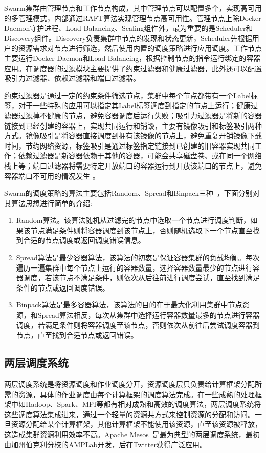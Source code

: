 Swarm集群由管理节点和工作节点构成，其中管理节点可以配置多个，实现高可用的多管理模式，内部通过RAFT算法实现管理节点高可用性。管理节点上除Docker Daemon守护进程、Load Balancing、Scaling组件外，最为重要的是Scheduler和Discovery组件。Discovery负责集群中节点的发现和状态更新，Scheduler先根据用户的资源需求对节点进行筛选，然后使用内置的调度策略进行应用调度。工作节点主要运行Docker Daemon和Load Balancing，根据控制节点的指令运行绑定的容器应用。在调度器的过滤模块主要提供了约束过滤器和健康过滤器，此外还可以配置吸引力过滤器、依赖过滤器和端口过滤器。

约束过滤器是通过一定的约束条件筛选节点，集群中每个节点都带有一个Label标签，对于一些特殊的应用可以指定其Label标签调度到指定的节点上运行；健康过滤器过滤掉不健康的节点，避免容器调度后运行失败；吸引力过滤器是将新的容器链接到已经创建的容器上，实现共同运行和销毁，主要有镜像吸引和标签吸引两种方式。镜像吸引是将容器直接调度到拥有该镜像的节点上，避免重复开销镜像下载时间，节约网络资源，标签吸引是通过标签指定链接到已创建的旧容器实现共同工作；依赖过滤器是新容器依赖于其他的容器，可能会共享磁盘卷、或在同一个网络栈上等；端口过滤器将需要特定开放端口的容器运行到开放该端口的节点上，避免容器端口不可用的情况发生	。

Swarm的调度策略的算法主要包括Random、Spread和Binpack三种~\cite{Cerin2017A}，下面分别对其算法思想进行简单的介绍:
\begin{enumerate}[1.]
	\item Random算法。该算法随机从过滤完的节点中选取一个节点进行调度判断，如果该节点满足条件则将容器调度到该节点上，否则随机选取下一个节点直至找到合适的节点调度或返回调度错误信息。
	\item Spread算法是最少容器算法，该算法的初衷是保证容器集群的负载均衡。每次遍历一遍集群中每个节点上运行的容器数量，选择容器数量最少的节点进行容器调度，若该节点不满足条件，则依次从后往前进行调度尝试，直至找到满足条件的节点或返回调度错误。
	\item Binpack算法是最多容器算法，该算法的目的在于最大化利用集群中节点资源，和Spread算法相反，每次从集群中选择运行容器数量最多的节点进行容器调度，若满足条件则将容器调度至该节点，否则依次从前往后尝试调度容器到节点，直至找到合适节点或返回错误。
\end{enumerate}

\subsection{两层调度系统}
两层调度系统是将资源调度和作业调度分开，资源调度层只负责给计算框架分配所需的资源，具体的作业调度由每个计算框架的调度算法完成。在一些成熟的处理框架中如Hadoop、Spark、MPI等都有相对成熟和高效的调度算法，两层调度系统将这些调度算法集成进来，通过一个轻量的资源共方式来控制资源的分配和访问。一旦资源分配给某个计算框架，其他计算框架不能使用该资源，直至该资源被释放，这造成集群资源利用效率不高。Apache Mesos~\cite{Mesos2011}是最为典型的两层调度系统，最初由加州伯克利分校的AMPLab开发，后在Twitter获得广泛应用。

